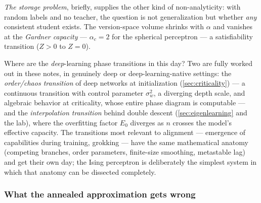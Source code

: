 \documentclass[11pt]{article}
\begin{document}
\emph{The storage problem}, briefly, supplies the other kind of
non-analyticity: with random labels and no teacher, the question is not
generalization but whether \emph{any} consistent student exists. The
version-space volume shrinks with $\alpha$ and vanishes at the
\emph{Gardner capacity} --- $\alpha_c = 2$ for the spherical perceptron
\cite{gardner1988space} --- a satisfiability transition ($Z > 0$ to
$Z = 0$).

\begin{callout}[note]
Where are the \emph{deep}-learning phase transitions in this day? Two are
fully worked out in these notes, in genuinely deep or deep-learning-native
settings: the \emph{order/chaos transition} of deep networks at
initialization (\cref{sec:criticality}) --- a continuous transition with
control parameter $\sigma_w^2$, a diverging depth scale, and algebraic
behavior at criticality, whose entire phase diagram is computable --- and
the \emph{interpolation transition} behind double descent
(\cref{sec:eigenlearning} and the lab), where the overfitting factor $E_0$
diverges as $n$ crosses the model's effective capacity. The transitions
most relevant to alignment --- emergence of capabilities during training,
grokking --- have the same mathematical anatomy (competing branches,
order parameters, finite-size smoothing, metastable lag) and get their own
day; the Ising perceptron is deliberately the simplest system in which
that anatomy can be dissected completely.
\end{callout}

\subsubsection{What the annealed approximation gets wrong}
\end{document}
